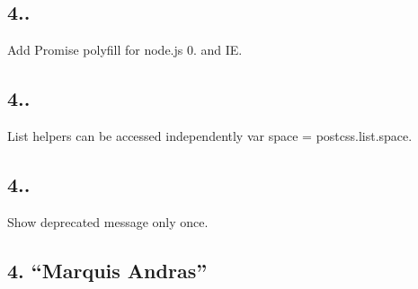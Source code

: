 \subsection*{4..}


\begin{DoxyItemize}
\item Add Promise polyfill for node.\+js 0. and IE.
\end{DoxyItemize}

\subsection*{4..}


\begin{DoxyItemize}
\item List helpers can be accessed independently {\ttfamily var space = postcss.\+list.\+space}.
\end{DoxyItemize}

\subsection*{4..}


\begin{DoxyItemize}
\item Show deprecated message only once.
\end{DoxyItemize}

\subsection*{4. “\+Marquis Andras”}


